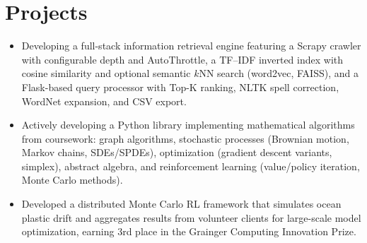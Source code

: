 \documentclass[letterpaper,10pt]{article}
\newcommand\vspacesize{-10pt}
\newcommand{\resumeItem}[1]{
  \item{
    {#1 \vspace{-2pt}}
  }
}
\newcommand{\resumeSubHeadingListStart}{\begin{itemize}[leftmargin=0.15in, label=]}
\newcommand{\resumeSubHeadingListEnd}{\end{itemize}}
\begin{document}
\section{Projects}
\resumeSubHeadingListStart
        \resumeProjectListStart
            \resumeItem{Developing a full-stack information retrieval engine featuring a Scrapy crawler with configurable depth and AutoThrottle, a TF–IDF inverted index with cosine similarity and optional semantic $k$NN search (word2vec, FAISS), and a Flask-based query processor with Top-K ranking, NLTK spell correction, WordNet expansion, and CSV export.}
        \resumeProjectListEnd

        \resumeProjectListStart
            \resumeItem{Actively developing a Python library implementing mathematical algorithms from coursework: graph algorithms, stochastic processes (Brownian motion, Markov chains, SDEs/SPDEs), optimization (gradient descent variants, simplex), abstract algebra, and reinforcement learning (value/policy iteration, Monte Carlo methods).}
        \resumeProjectListEnd

        \resumeProjectListStart
            \resumeItem{Developed a distributed Monte Carlo RL framework that simulates ocean plastic drift and aggregates results from volunteer clients for large-scale model optimization, earning 3rd place in the Grainger Computing Innovation Prize.}
        \resumeProjectListEnd
    
    
\resumeSubHeadingListEnd
\vspace{\vspacesize}
\end{document}
